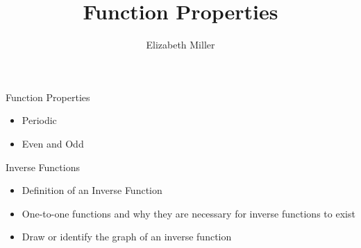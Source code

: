 \documentclass{ximera}
\author{Elizabeth Miller}
\title{Function Properties}
\begin{document}
\begin{abstract}
\end{abstract}
\maketitle


\begin{objectives}

\item Function Properties
\begin{itemize}
	\item Periodic
	\item Even and Odd
\end{itemize}
\item Inverse Functions
\begin{itemize}
	\item Definition of an Inverse Function
	\item One-to-one functions and why they are necessary for inverse functions to exist
	\item Draw or identify the graph of an inverse function
\end{itemize}


\end{objectives}
\end{document}

